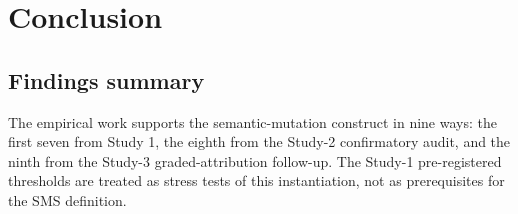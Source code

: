 \documentclass[manuscript,screen,review]{acmart}
\begin{document}


\section{Conclusion}\label{conclusion}

\subsection{Findings summary}\label{findings-summary}

The empirical work supports the semantic-mutation construct in nine
ways: the first seven from Study 1, the eighth from the Study-2
confirmatory audit, and the ninth from the Study-3 graded-attribution
follow-up. The Study-1 pre-registered thresholds are treated as
stress tests of this instantiation, not as prerequisites for the SMS
definition.
\end{document}
